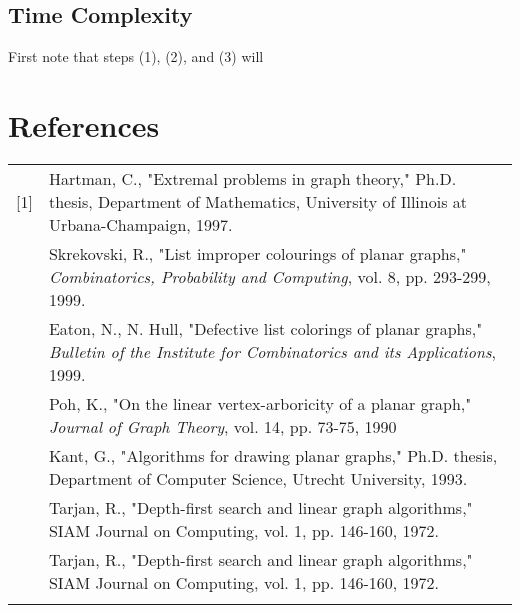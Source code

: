 \documentclass[11pt,letter]{article}
\begin{document}
\subsection*{Time Complexity}

First note that steps (1), (2), and (3) will 

\begin{comment}
\begin{algorithm}
\LinesNumbered
\DontPrintSemicolon
\KwIn{Plane graph $G$ and paths $P=p_0\ldots p_n$ and $Q=q_0\ldots q_m$}
\Begin{
	\Repeat{$t_0\not\in P\cup Q$} {
		$t_0\longleftarrow$ vertex forming face with $p_0$ and $q_0$\;
		\If{$t_0 = p_1$} {
			$P\longleftarrow P - p_0$\;
		}
		\ElseIf{$t_0 = q_1$} {
			$Q\longleftarrow Q - q_0$\; 
		}
	}
	\Repeat{$t_1\not\in P\cup Q$} {
		$t_1\longleftarrow$ vertex forming face with $p_n$ and $q_m$\;
		\If{$t_1 = p_{n-1}$} {
			$P\longleftarrow P - p_n$\;
		}
		\ElseIf{$t_1 = q_{m-1}$} {
			$Q\longleftarrow Q - q_m$\; 
		}
	}
	perform BFS starting at $t_1$\;
	\If{BFS finds $t_0$} {
		$T\longleftarrow$ BFS path $t_0$ to $t_1$\;
	}
	\Else {
		we hit an vertex $u$ with neighbors $p_i\in P$ and $q_j\in Q$\;
		$T\longleftarrow$ BFS path $u$ to $t_1$\;
		recurse on subgraph bounded by $p_0\ldots p_i$ and $q_0\ldots q_j$\;
		$P\longleftarrow p_i\ldots p_n$\;
		$Q\longleftarrow q_j\ldots q_m$\;
	}
	recurse on subgraph bounded by $P$ and $T$\;
	recurse on subgraph bounded by $T$ and $Q$\;
}
\caption{Path 3-Color}
\end{algorithm}
\end{comment}

\section*{References}

\begin{tabularx}{\linewidth}{lX}
[1] & Hartman, C., "Extremal problems in graph theory," Ph.D. thesis, Department of Mathematics,
University of Illinois at Urbana-Champaign, 1997.\\\relax
[2] & Skrekovski, R., "List improper colourings of planar graphs,"
\emph{Combinatorics, Probability and Computing}, vol. 8, pp. 293-299, 1999.\\\relax
[3] & Eaton, N., N. Hull, "Defective list colorings of planar graphs,"
\emph{Bulletin of the Institute for Combinatorics and its Applications}, 1999.\\\relax
[4] & Poh, K., "On the linear vertex-arboricity of a planar graph," \emph{Journal of Graph Theory},
vol. 14, pp. 73-75, 1990\\\relax
[5] & Kant, G., "Algorithms for drawing planar graphs," Ph.D. thesis, Department of Computer Science,
Utrecht University, 1993.\\\relax
[6] & Tarjan, R., "Depth-first search and linear graph algorithms," SIAM Journal on Computing, vol. 1, pp.
146-160, 1972.\\\relax
[6] & Tarjan, R., "Depth-first search and linear graph algorithms," SIAM Journal on Computing, vol. 1, pp.
146-160, 1972.\\\relax
\end{tabularx}
\end{document}
